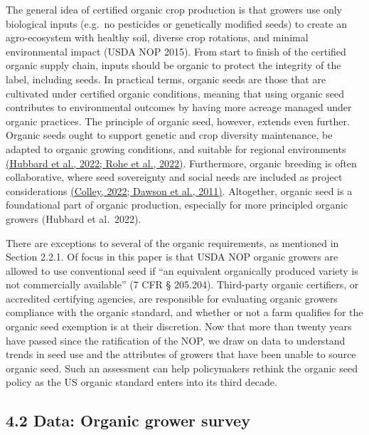 \documentclass[twoside,12pt,final]{ucthesis-CA2012}
\begin{document}
\begin{ucmainmatter}
The general idea of certified organic crop production is that growers
use only biological inputs (e.g.~no pesticides or genetically modified
seeds) to create an agro-ecosystem with healthy soil, diverse crop
rotations, and minimal environmental impact (USDA NOP 2015). From start
to finish of the certified organic supply chain, inputs should be
organic to \textquotesingle protect the integrity\textquotesingle{} of the label, including seeds. In
practical terms, organic seeds are those that are cultivated under
certified organic conditions, meaning that using organic seed
contributes to environmental outcomes by having more acreage managed
under organic practices. The principle of organic seed, however, extends
even further. Organic seeds ought to support genetic and crop diversity
maintenance, be adapted to organic growing conditions, and suitable for
regional environments \href{https://www.zotero.org/google-docs/?broken=pvMEt9}{(Hubbard et al., 2022; Rohe et al.,
2022)}. Furthermore,
organic breeding is often collaborative, where seed sovereignty and
social needs are included as project considerations \href{https://www.zotero.org/google-docs/?broken=6ndb0v}{(Colley, 2022;
Dawson et al.,
2011)}. Altogether,
organic seed is a foundational part of organic production, especially
for more principled organic growers (Hubbard et al.~2022).

There are exceptions to several of the organic requirements, as
mentioned in Section 2.2.1. Of focus in this paper is that USDA NOP
organic growers are allowed to use conventional seed if ``an equivalent
organically produced variety is not commercially available'' (7 CFR §
205.204). Third-party organic certifiers, or accredited certifying
agencies, are responsible for evaluating organic growers\textquotesingle{} compliance
with the organic standard, and whether or not a farm qualifies for the
organic seed exemption is at their discretion. Now that more than twenty
years have passed since the ratification of the NOP, we draw on data to
understand trends in seed use and the attributes of growers that have
been unable to source organic seed. Such an assessment can help
policymakers rethink the organic seed policy as the US organic standard
enters into its third decade.

\hypertarget{data-organic-grower-survey}{%
\subsection{4.2 Data: Organic grower survey}\label{data-organic-grower-survey}}


\end{ucmainmatter}
\end{document}
